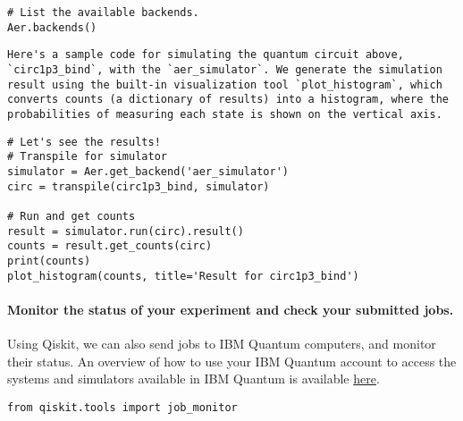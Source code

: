 \documentclass[%
oneside,                 %
final,                   %
10pt]{article}
\begin{document}
\begin{verbatim}
# List the available backends.
Aer.backends()

\end{verbatim}




\begin{verbatim}
Here's a sample code for simulating the quantum circuit above, `circ1p3_bind`, with the `aer_simulator`. We generate the simulation result using the built-in visualization tool `plot_histogram`, which converts counts (a dictionary of results) into a histogram, where the probabilities of measuring each state is shown on the vertical axis.

\end{verbatim}













\begin{verbatim}
# Let's see the results! 
# Transpile for simulator
simulator = Aer.get_backend('aer_simulator')
circ = transpile(circ1p3_bind, simulator)

# Run and get counts
result = simulator.run(circ).result()
counts = result.get_counts(circ)
print(counts)    
plot_histogram(counts, title='Result for circ1p3_bind')

\end{verbatim}


\paragraph{Monitor the status of your experiment and check your submitted jobs.}
Using Qiskit, we can also send jobs to IBM Quantum computers, and monitor their status.
An overview of how to use your IBM Quantum account to access the systems and simulators available in IBM Quantum is available \href{{https://quantum-computing.ibm.com/lab/docs/iql/manage/account/ibmq}}{here}.



\begin{verbatim}
from qiskit.tools import job_monitor

\end{verbatim}
\end{document}
